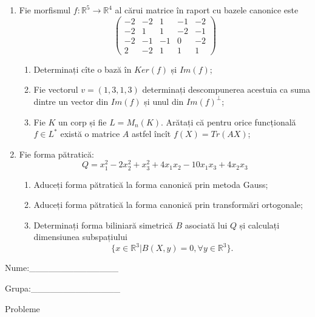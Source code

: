 \documentclass{article}
\begin{document}
\begin{enumerate}
 \item Fie morfismul $f:\mathbb{R}^5 \to \mathbb{R}^4$ al cărui matrice în raport cu bazele canonice este
$$\begin{pmatrix}
-2&-2&1&-1&-2\\
-2&1&1&-2&-1\\
-2&-1&-1&0&-2\\
2&-2&1&1&1
\end{pmatrix}$$

\begin{enumerate}
\item Determinați cîte o bază în $Ker(f)$ și $Im(f)$;
\item Fie vectorul $v=(1,3,1,3)$ determinați descompunerea acestuia ca suma dintre un vector din $Im(f)$ și unul din $Im(f)^\perp$;
\item Fie $K$ un corp și fie $L=M_n(K)$. Arătați că pentru orice funcțională $f \in L^*$ există o matrice $A$ astfel încît $f(X)=Tr(AX)$;
\end{enumerate}
\item Fie forma pătratică:
$$Q= x_1^2-2x_2^2+x_3^2+4x_1x_2-10x_1x_3+4x_2x_3$$

\begin{enumerate}
\item Aduceți forma pătratică la forma canonică prin metoda Gauss;
\item Aduceți forma pătratică la forma canonică prin transformări ortogonale;
\item Determinați forma biliniară simetrică $B$ asociată lui $Q$ și calculați dimensiunea subspațiului
$$\{x \in \mathbb{R}^3 | B(X,y)=0,\forall y \in \mathbb{R}^3\}.$$

\end{enumerate}
\end{enumerate}
\newpage
\begin{flushright}
Nume:\_\_\_\_\_\_\_\_\_\_\_\_\_\_
 
 
Grupa:\_\_\_\_\_\_\_\_\_\_\_\_\_\_
\end{flushright}
\begin{center}
\vspace{2cm}
{\Large Probleme}
\vspace{2cm}
\end{center}
\end{document}
